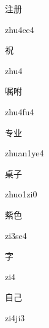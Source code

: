 \begin{multicols*}{2}
\begin{verbete}[zhu4ce4]{注册}
\begin{pronuncia}{zhu4ce4}
\end{pronuncia}
\end{verbete}

\begin{verbete}[zhu4]{祝}
\begin{pronuncia}{zhu4}
\end{pronuncia}
\end{verbete}

\begin{verbete}[zhu4fu4]{嘱咐}
\begin{pronuncia}{zhu4fu4}
\end{pronuncia}
\end{verbete}

\begin{verbete}[zhuan1ye4]{专业}
\begin{pronuncia}{zhuan1ye4}
\end{pronuncia}
\end{verbete}

\begin{verbete}[zhuo1zi0]{桌子}
\begin{pronuncia}{zhuo1zi0}
\end{pronuncia}
\end{verbete}

\begin{verbete}[zi3se4]{紫色}
\begin{pronuncia}{zi3se4}
\end{pronuncia}
\end{verbete}

\begin{verbete}[zi4]{字}
\begin{pronuncia}{zi4}
\end{pronuncia}
\end{verbete}

\begin{verbete}[zi4ji3]{自己}
\begin{pronuncia}{zi4ji3}
\end{pronuncia}
\end{verbete}


\end{multicols*}
